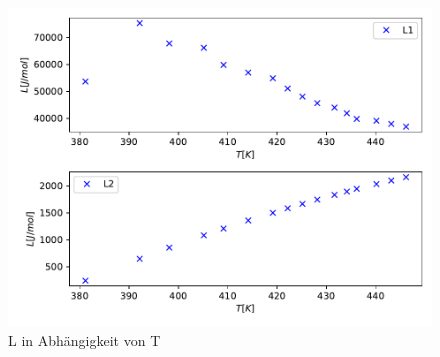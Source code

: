 \begin{figure}
  \centering
  \includegraphics[scale = 0.75]{Auswertung/d2.pdf}
  \caption{L in Abhängigkeit von T}
  \label{fig:L}
\end{figure}

